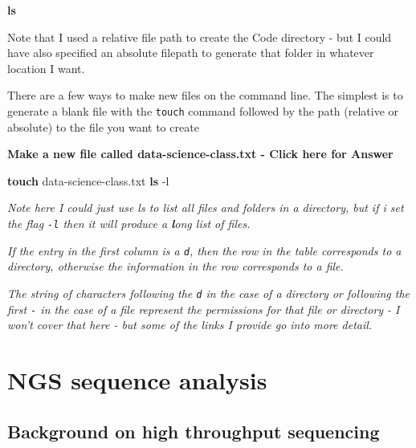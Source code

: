 \documentclass[
]{book}
\newenvironment{Shaded}{\begin{snugshade}}{\end{snugshade}}
\newcommand{\AttributeTok}[1]{\textcolor[rgb]{0.13,0.29,0.53}{#1}}
\newcommand{\FunctionTok}[1]{\textcolor[rgb]{0.13,0.29,0.53}{\textbf{#1}}}
\newcommand{\NormalTok}[1]{#1}
\begin{document}
\begin{Shaded}
\begin{Highlighting}[]
\FunctionTok{ls}
\end{Highlighting}
\end{Shaded}

Note that I used a relative file path to create the Code directory - but I could have also specified an absolute filepath to generate that folder in whatever location I want.

There are a few ways to make new files on the command line. The simplest is to generate a blank file with the \texttt{touch} command followed by the path (relative or absolute) to the file you want to create

\textbf{Make a new file called data-science-class.txt - Click here for Answer}

\begin{Shaded}
\begin{Highlighting}[]
\FunctionTok{touch}\NormalTok{ data{-}science{-}class.txt}
\FunctionTok{ls} \AttributeTok{{-}l}
\end{Highlighting}
\end{Shaded}

\emph{Note here I could just use ls to list all files and folders in a directory, but if i set the flag \texttt{-l} then it will produce a \textbf{l}ong list of files.}

\emph{If the entry in the first column is a \texttt{d}, then the row in the table corresponds to a directory, otherwise the information in the row corresponds to a file.}

\emph{The string of characters following the \texttt{d} in the case of a directory or following the first \texttt{-} in the case of a file represent the permissions for that file or directory - I won't cover that here - but some of the links I provide go into more detail.}

\hypertarget{ngs-sequence-analysis}{%
\chapter{NGS sequence analysis}\label{ngs-sequence-analysis}}

\hypertarget{background-on-high-throughput-sequencing}{%
\section{Background on high throughput sequencing}\label{background-on-high-throughput-sequencing}}
\end{document}
